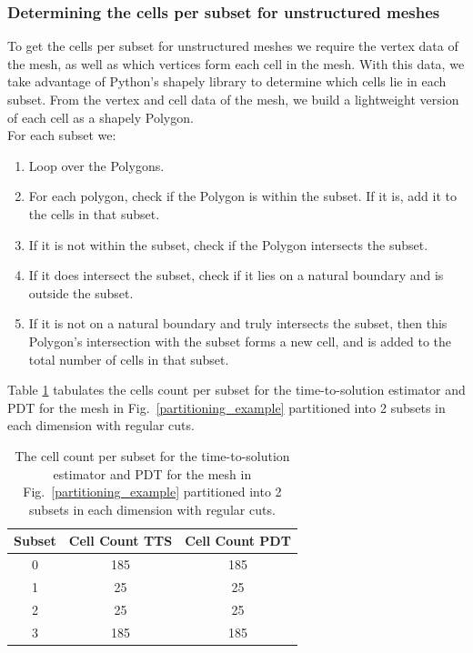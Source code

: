 \subsubsection{Determining the cells per subset for unstructured meshes}
To get the cells per subset for unstructured meshes we require the vertex data of the mesh, as well as which vertices form each cell in the mesh.
With this data, we take advantage of Python's shapely library \cite{shapely} to determine which cells lie in each subset. From the vertex and cell data of the mesh, we build a lightweight version of each cell as a shapely Polygon.\\
\noindent
For each subset we:
\begin{enumerate}
  \item Loop over the Polygons.
  \item For each polygon, check if the Polygon is within the subset. If it is, add it to the cells in that subset.
  \item If it is not within the subset, check if the Polygon intersects the subset.
  \item If it does intersect the subset, check if it lies on a natural boundary and is outside the subset.
  \item If it is not on a natural boundary and truly intersects the subset, then this Polygon's intersection with the subset forms a new cell,  and is added to the total number of cells in that subset.
\end{enumerate}
Table \ref{2x2_cellcount} tabulates the cells count per subset for the time-to-solution estimator and PDT for the mesh in Fig.~\ref{partitioning_example} partitioned into 2 subsets in each dimension with regular cuts.
\begin{table}[H]
\centering
\caption{The cell count per subset for the time-to-solution estimator and PDT for the mesh in Fig.~\ref{partitioning_example} partitioned into 2 subsets in each dimension with regular cuts.}
\label{2x2_cellcount}
\begin{tabular}{c|c|c}
\textbf{Subset} & \textbf{Cell Count TTS} & \textbf{Cell Count PDT} \\ \hline
0 & 185 & 185 \\ \hline
1 & 25 & 25 \\ \hline
2 & 25 & 25 \\ \hline
3 & 185 & 185
\end{tabular}
\end{table}

